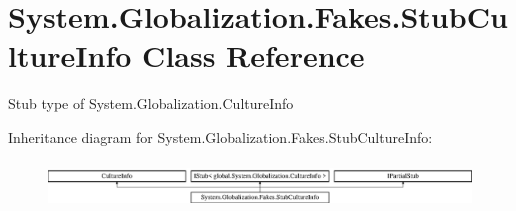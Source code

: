 \hypertarget{class_system_1_1_globalization_1_1_fakes_1_1_stub_culture_info}{\section{System.\-Globalization.\-Fakes.\-Stub\-Culture\-Info Class Reference}
\label{class_system_1_1_globalization_1_1_fakes_1_1_stub_culture_info}
}


Stub type of System.\-Globalization.\-Culture\-Info 


Inheritance diagram for System.\-Globalization.\-Fakes.\-Stub\-Culture\-Info\-:\begin{figure}[H]
\begin{center}
\leavevmode
\includegraphics[height=1.278539cm]{class_system_1_1_globalization_1_1_fakes_1_1_stub_culture_info}
\end{center}
\end{figure}
